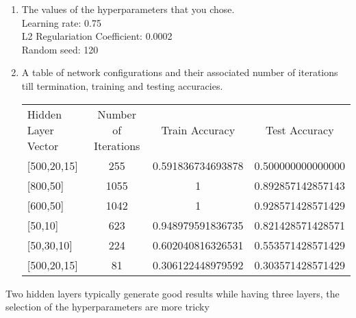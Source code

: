 \documentclass[12pt]{article}
\begin{document}
\begin{enumerate}
\item The values of the hyperparameters that you chose.\\
Learning rate: 0.75\\L2 Regulariation Coefficient: 0.0002\\Random seed: 120
\item A table of network configurations and their associated number of iterations till termination, training and testing accuracies.\\
\begin{table}[H]
\begin{tabular}{lccc}
Hidden Layer Vector & Number of Iterations & Train Accuracy    & Test Accuracy     \\
{[}500,20,15{]}     & 255                 & 0.591836734693878 & 0.500000000000000 \\
{[}800,50{]}        & 1055                & 1                 & 0.892857142857143 \\
{[}600,50{]}        & 1042                & 1                 & 0.928571428571429 \\
{[}50,10{]}         & 623                 & 0.948979591836735 & 0.821428571428571 \\
{[}50,30,10{]}      & 224                 & 0.602040816326531 & 0.553571428571429 \\
{[}500,20,15{]}     & 81                  & 0.306122448979592 & 0.303571428571429
\end{tabular}
\end{table}

\end{enumerate}
Two hidden layers typically generate good results while having three layers, the selection of the hyperparameters are more tricky
\end{document}

